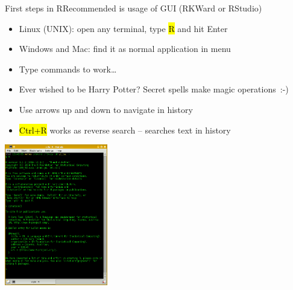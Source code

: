 \documentclass[compress, ucs, xelatex, 11pt, xcolor=svgnames,
  hyperref={
    bookmarks=true,
    unicode=true,
    colorlinks=true,
    pdftitle={Molecular data in R},
    plainpages=false,
    pdfauthor={Vojtech Zeisek},
    pdfsubject={Course about phylogeny and evolution in R},
    pdfcreator={XeLaTeX},
    pdfkeywords={R, evolution, phylogeny, molecular data},
    linkcolor=Tomato,
    anchorcolor=SaddleBrown,
    citecolor=Goldenrod,
    filecolor=DarkMagenta,
    menucolor=Sienna,
    urlcolor=DarkTurquoise,
    pdftex},
  url={hyphens, lowtilde} %
  ]{beamer}
\renewcommand{\texttt}[1]{\hl{\ttfamily #1}}
\begin{document}
\begin{frame}{First steps in R}{Recommended is usage of GUI (RKWard or RStudio)}
  \begin{multicols}{2}
    \begin{itemize}
      \item Linux (UNIX): open any terminal, type \texttt{R} and hit Enter
      \item Windows and Mac: find it as normal application in menu
      \item Type commands to work\ldots
      \item \alert{Ever wished to be Harry Potter? Secret spells make magic operations~:-)}
      \item Use arrows up and down to navigate in history
      \item \texttt{Ctrl+R} works as reverse search -- searches text in history
    \end{itemize}
    \columnbreak
    \begin{center}
      \includegraphics[width=4.5cm]{rkonsole.png}
    \end{center}
  \end{multicols}
\end{frame}
\end{document}
